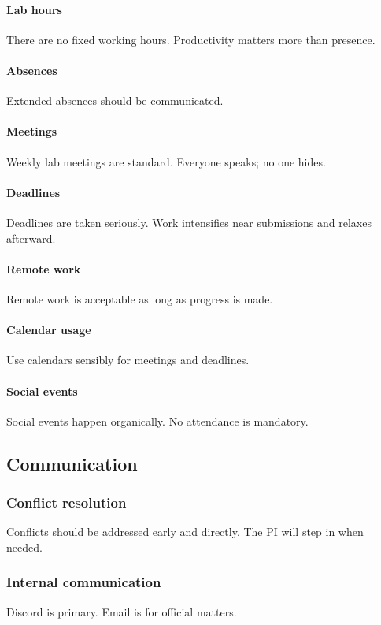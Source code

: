 \documentclass[11pt]{article}
\begin{document}
\paragraph{Lab hours}
There are no fixed working hours.
Productivity matters more than presence.

\paragraph{Absences}
Extended absences should be communicated.

\paragraph{Meetings}
Weekly lab meetings are standard.
Everyone speaks; no one hides.

\paragraph{Deadlines}
Deadlines are taken seriously.
Work intensifies near submissions and relaxes afterward.

\paragraph{Remote work}
Remote work is acceptable as long as progress is made.

\paragraph{Calendar usage}
Use calendars sensibly for meetings and deadlines.

\paragraph{Social events}
Social events happen organically.
No attendance is mandatory.

\subsection{Communication}

\subsubsection{Conflict resolution}
Conflicts should be addressed early and directly.
The PI will step in when needed.

\subsubsection{Internal communication}
Discord is primary.
Email is for official matters.
\end{document}
